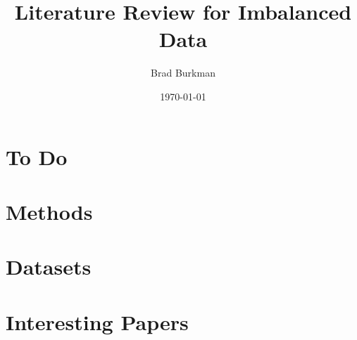 \documentclass[11pt]{report}
\title{Literature Review for Imbalanced Data}
\author{Brad Burkman}
\date{\today}
\begin{document}
\setlength{\parindent}{20pt}
\begin{spacing}{1.2}
\maketitle
\tableofcontents


\newpage
{}
{}
\printindex


\chapter{To Do}


\chapter{Methods}









\chapter{Datasets}




\chapter{Interesting Papers}



\newpage
{}
{}
\printbibliography



\end{spacing}
\end{document}
